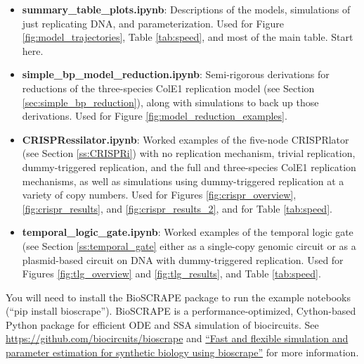 \documentclass[preprint,12pt]{oldplainarticle}
\begin{document}
\begin{itemize}
	\item \textbf{summary\_table\_plots.ipynb}: Descriptions of the models, simulations of just replicating DNA, and parameterization. Used for Figure \ref{fig:model_trajectories}, Table \ref{tab:speed}, and most of the main table. Start here.
	\item \textbf{simple\_bp\_model\_reduction.ipynb}: Semi-rigorous derivations for reductions of the three-species ColE1 replication model (see Section \ref{sec:simple_bp_reduction}), along with simulations to back up those derivations. Used for Figure \ref{fig:model_reduction_examples}.
	\item \textbf{CRISPRessilator.ipynb}: Worked examples of the five-node CRISPRlator (see Section \ref{ss:CRISPRi}) with no replication mechanism, trivial replication, dummy-triggered replication, and the full and three-species ColE1 replication mechanisms, as well as simulations using dummy-triggered replication at a variety of copy numbers. Used for Figures \ref{fig:crispr_overview}, \ref{fig:crispr_results}, and \ref{fig:crispr_results_2}, and for Table \ref{tab:speed}.
	\item \textbf{temporal\_logic\_gate.ipynb}: Worked examples of the temporal logic gate (see Section \ref{ss:temporal_gate} either as a single-copy genomic circuit or as a plasmid-based circuit on DNA with dummy-triggered replication. Used for Figures \ref{fig:tlg_overview} and \ref{fig:tlg_results}, and Table \ref{tab:speed}.
\end{itemize}

You will need to install the BioSCRAPE package to run the example notebooks (``pip install bioscrape''). BioSCRAPE is a performance-optimized, Cython-based Python package for efficient ODE and SSA simulation of biocircuits. See \url{https://github.com/biocircuits/bioscrape} and \href{https://doi.org/10.1101/121152}{``Fast and flexible simulation and parameter estimation for synthetic biology using bioscrape''} for more information.





%


\end{document}
